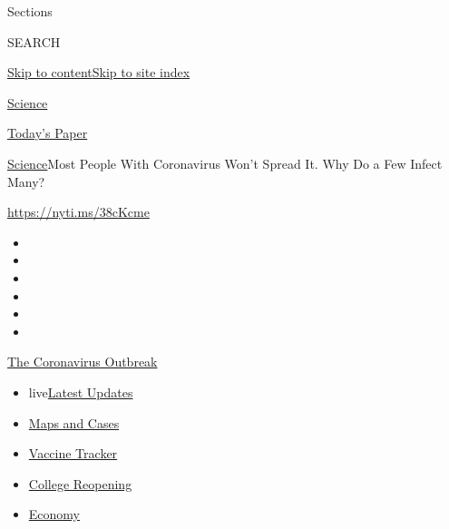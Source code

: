 Sections

SEARCH

\protect\hyperlink{site-content}{Skip to
content}\protect\hyperlink{site-index}{Skip to site index}

\href{https://www.nytimes.com/section/science}{Science}

\href{https://myaccount.nytimes.com/auth/login?response_type=cookie\&client_id=vi}{}

\href{https://www.nytimes.com/section/todayspaper}{Today's Paper}

\href{/section/science}{Science}\textbar{}Most People With Coronavirus
Won't Spread It. Why Do a Few Infect Many?

\url{https://nyti.ms/38cKcme}

\begin{itemize}
\item
\item
\item
\item
\item
\item
\end{itemize}

\href{https://www.nytimes.com/news-event/coronavirus?action=click\&pgtype=Article\&state=default\&region=TOP_BANNER\&context=storylines_menu}{The
Coronavirus Outbreak}

\begin{itemize}
\tightlist
\item
  live\href{https://www.nytimes.com/2020/08/04/world/coronavirus-cases.html?action=click\&pgtype=Article\&state=default\&region=TOP_BANNER\&context=storylines_menu}{Latest
  Updates}
\item
  \href{https://www.nytimes.com/interactive/2020/us/coronavirus-us-cases.html?action=click\&pgtype=Article\&state=default\&region=TOP_BANNER\&context=storylines_menu}{Maps
  and Cases}
\item
  \href{https://www.nytimes.com/interactive/2020/science/coronavirus-vaccine-tracker.html?action=click\&pgtype=Article\&state=default\&region=TOP_BANNER\&context=storylines_menu}{Vaccine
  Tracker}
\item
  \href{https://www.nytimes.com/2020/08/02/us/covid-college-reopening.html?action=click\&pgtype=Article\&state=default\&region=TOP_BANNER\&context=storylines_menu}{College
  Reopening}
\item
  \href{https://www.nytimes.com/live/2020/08/04/business/stock-market-today-coronavirus?action=click\&pgtype=Article\&state=default\&region=TOP_BANNER\&context=storylines_menu}{Economy}
\end{itemize}

